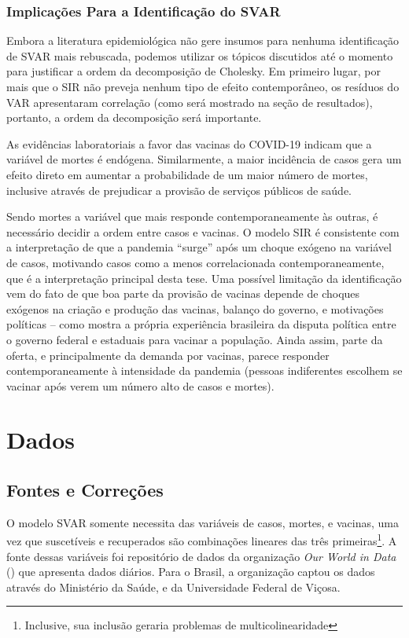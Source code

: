 \documentclass[
	12pt,				%
	oneside,			%
	a4paper,			%
	english,			%
	brazil				%
	hyperref = {colorlinks, citecolor=c1d, linkcolor=c2d, urlcolor=c3d, colorlinks}
	]{abntex2}
\newcounter{j}
\begin{document}
\subsection{Implicações Para a Identificação do SVAR}

Embora a literatura epidemiológica não gere insumos para nenhuma identificação de SVAR mais rebuscada, podemos utilizar os tópicos discutidos até o momento para justificar a ordem da decomposição de Cholesky. Em primeiro lugar, por mais que o SIR não preveja nenhum tipo de efeito contemporâneo, os resíduos do VAR apresentaram correlação (como será mostrado na seção de resultados), portanto, a ordem da decomposição será importante.

As evidências laboratoriais a favor das vacinas do COVID-19 indicam que a variável de mortes é endógena. Similarmente, a maior incidência de casos gera um efeito direto em aumentar a probabilidade de um maior número de mortes, inclusive através de prejudicar a provisão de serviços públicos de saúde.

Sendo mortes a variável que mais responde contemporaneamente às outras, é necessário decidir a ordem entre casos e vacinas. O modelo SIR é consistente com a interpretação de que a pandemia ``surge'' após um choque exógeno na variável de casos, motivando casos como a menos correlacionada contemporaneamente, que é a interpretação principal desta tese. Uma possível limitação da identificação vem do fato de que boa parte da provisão de vacinas depende de choques exógenos na criação e produção das vacinas, balanço do governo, e motivações políticas -- como mostra a própria experiência brasileira da disputa política entre o governo federal e estaduais para vacinar a população. Ainda assim, parte da oferta, e principalmente da demanda por vacinas, parece responder contemporaneamente à intensidade da pandemia (pessoas indiferentes escolhem se vacinar após verem um número alto de casos e mortes).

\let\clearpage\relax
\chapter{Dados}
\section{Fontes e Correções}
O modelo SVAR somente necessita das variáveis de casos, mortes, e vacinas, uma vez que suscetíveis e recuperados são combinações lineares das três primeiras\footnote{Inclusive, sua inclusão geraria problemas de multicolinearidade}. A fonte dessas variáveis foi repositório de dados da organização \textit{Our World in Data} (\textcite{Owid}) que apresenta dados diários. Para o Brasil, a organização captou os dados através do Ministério da Saúde, e da Universidade Federal de Viçosa.
\end{document}
